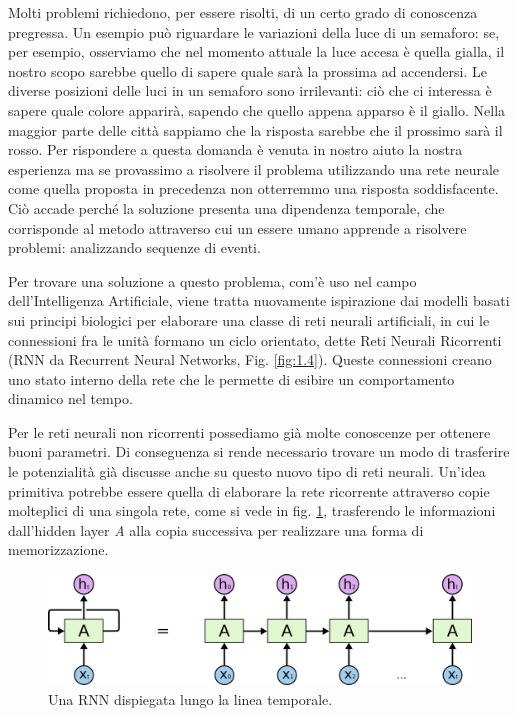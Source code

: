 Molti problemi richiedono, per essere risolti, di un certo grado di conoscenza pregressa. Un esempio può riguardare le variazioni della luce di un semaforo: se, per esempio, osserviamo che nel momento attuale la luce accesa è quella gialla, il nostro scopo sarebbe quello di sapere quale sarà la prossima ad accendersi. Le diverse posizioni delle luci in un semaforo sono irrilevanti: ciò che ci interessa è sapere quale colore apparirà, sapendo che quello appena apparso è il giallo. Nella maggior parte delle città sappiamo che la risposta sarebbe che il prossimo sarà il rosso. Per rispondere a questa domanda è venuta in nostro aiuto la nostra esperienza ma se provassimo a risolvere il problema utilizzando una rete neurale come quella proposta in precedenza non otterremmo una risposta soddisfacente. Ciò accade perché la soluzione presenta una dipendenza temporale, che corrisponde al metodo attraverso cui un essere umano apprende a risolvere problemi: analizzando sequenze di eventi.

Per trovare una soluzione a questo problema, com'è uso nel campo dell'Intelligenza Artificiale, viene tratta nuovamente ispirazione dai modelli basati sui principi biologici per elaborare una classe di reti neurali artificiali, in cui le connessioni fra le unità formano un ciclo orientato, dette Reti Neurali Ricorrenti (RNN da Recurrent Neural Networks, Fig. \ref{fig:1.4}). Queste connessioni creano uno stato interno della rete che le permette di esibire un comportamento dinamico nel tempo.

Per le reti neurali non ricorrenti possediamo già molte conoscenze per ottenere buoni parametri. Di conseguenza si rende necessario trovare un modo di trasferire le potenzialità già discusse anche su questo nuovo tipo di reti neurali. Un'idea primitiva potrebbe essere quella di elaborare la rete ricorrente attraverso copie molteplici di una singola rete, come si vede in fig. \ref{fig:1.5}, trasferendo le informazioni dall'hidden layer \textit{A} alla copia successiva per realizzare una forma di memorizzazione.

\begin{figure}[ht]
	\centering
	\includegraphics{img/unrolled_rnn.png}
	\caption{Una RNN dispiegata lungo la linea temporale.}
	\label{fig:1.5}
\end{figure}

